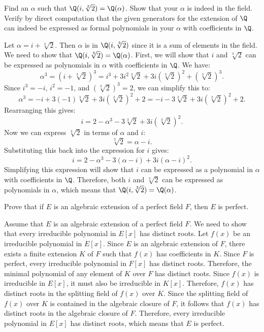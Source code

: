 \begin{problem}[45.4]
  Find an $\alpha$ such that $\Q(i, \sqrt[3]{2}) = \Q(\alpha)$. Show that your $\alpha$ is indeed in the field. Verify by direct computation that the given generators for the extension of $\Q$ can indeed be expressed as formal polynomials in your $\alpha$ with coefficients in $\Q$.
\end{problem}

\begin{solution}
  Let $\alpha = i + \sqrt[3]{2}$. Then $\alpha$ is in $\Q(i, \sqrt[3]{2})$ since it is a sum of elements in the field. We need to show that $\Q(i, \sqrt[3]{2}) = \Q(\alpha)$. First, we will show that $i$ and $\sqrt[3]{2}$ can be expressed as polynomials in $\alpha$ with coefficients in $\Q$. We have:
  \[%
    \alpha^3 = (i + \sqrt[3]{2})^3 = i^3 + 3i^2\sqrt[3]{2} + 3i(\sqrt[3]{2})^2 + (\sqrt[3]{2})^3
  .\]%
  Since $i^3 = -i$, $i^2 = -1$, and $(\sqrt[3]{2})^3 = 2$, we can simplify this to:
  \[%
    \alpha^3 = -i + 3(-1)\sqrt[3]{2} + 3i(\sqrt[3]{2})^2 + 2 = -i - 3\sqrt[3]{2} + 3i(\sqrt[3]{2})^2 + 2
  .\]%
  Rearranging this gives:
  \[%
    i = 2 - \alpha^3 - 3\sqrt[3]{2} + 3i(\sqrt[3]{2})^2
  .\]%
  Now we can express $\sqrt[3]{2}$ in terms of $\alpha$ and $i$:
  \[%
    \sqrt[3]{2} = \alpha - i
  .\]%
  Substituting this back into the expression for $i$ gives:
  \[%
    i = 2 - \alpha^3 - 3(\alpha - i) + 3i(\alpha - i)^2
  .\]%
  Simplifying this expression will show that $i$ can be expressed as a polynomial in $\alpha$ with coefficients in $\Q$. Therefore, both $i$ and $\sqrt[3]{2}$ can be expressed as polynomials in $\alpha$, which means that $\Q(i, \sqrt[3]{2}) = \Q(\alpha)$.
\end{solution}

\begin{problem}[45.10]
  Prove that if $E$ is an algebraic extension of a perfect field $F$, then $E$ is perfect.
\end{problem}

\begin{solution}
  Assume that $E$ is an algebraic extension of a perfect field $F$. We need to show that every irreducible polynomial in $E[x]$ has distinct roots. Let $f(x)$ be an irreducible polynomial in $E[x]$. Since $E$ is an algebraic extension of $F$, there exists a finite extension $K$ of $F$ such that $f(x)$ has coefficients in $K$. Since $F$ is perfect, every irreducible polynomial in $F[x]$ has distinct roots. Therefore, the minimal polynomial of any element of $K$ over $F$ has distinct roots. Since $f(x)$ is irreducible in $E[x]$, it must also be irreducible in $K[x]$. Therefore, $f(x)$ has distinct roots in the splitting field of $f(x)$ over $K$. Since the splitting field of $f(x)$ over $K$ is contained in the algebraic closure of $F$, it follows that $f(x)$ has distinct roots in the algebraic closure of $F$. Therefore, every irreducible polynomial in $E[x]$ has distinct roots, which means that $E$ is perfect.
\end{solution}

